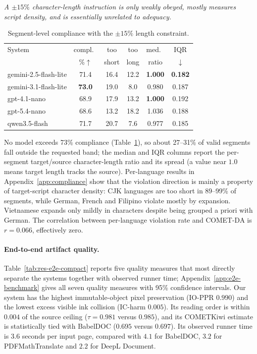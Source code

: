 \emph{A $\pm15\%$ character-length instruction is only weakly obeyed, mostly
measures script density, and is essentially unrelated to adequacy.}

\begin{table}[H]
    \centering
    \small
    \caption{Segment-level compliance with the $\pm15\%$ length constraint.}
    \label{tab:compliance-results}
    \setlength{\tabcolsep}{5pt}
    \begin{tabular}{@{}lccccc@{}}
        \toprule
        System & compl.\ & too & too & med.\ & IQR \\
               & \%$\uparrow$ & short & long & ratio & $\downarrow$ \\
        \midrule
        gemini-2.5-flash-lite & 71.4 & 16.4 & 12.2 & \textbf{1.000} & \textbf{0.182} \\
        gemini-3.1-flash-lite & \textbf{73.0} & 19.0 & 8.0 & 0.980 & 0.187 \\
        gpt-4.1-nano          & 68.9 & 17.9 & 13.2 & \textbf{1.000} & 0.192 \\
        gpt-5.4-nano          & 68.6 & 13.2 & 18.2 & 1.036 & 0.188 \\
        qwen3.5-flash         & 71.7 & 20.7 & 7.6 & 0.977 & 0.185 \\
        \bottomrule
    \end{tabular}
\end{table}

No model exceeds 73\% compliance (Table~\ref{tab:compliance-results}), so about
27--31\% of valid segments fall outside the requested band; the median and IQR
columns report the per-segment target/source character-length ratio and its
spread (a value near $1.0$ means target length tracks the source). Per-language results in Appendix~\ref{app:compliance}
show that the violation direction is mainly a property of target-script
character density: CJK languages are too short in 89--99\% of segments, while
German, French and Filipino violate mostly by expansion. Vietnamese expands only
mildly in characters despite being grouped a priori with German. The correlation
between per-language violation rate and COMET-DA is $r=0.066$, effectively zero.

\paragraph{End-to-end artifact quality.}
Table~\ref{tab:res-e2e-compact} reports five quality measures that most directly
separate the systems together with observed runner time;
Appendix~\ref{app:e2e-benchmark} gives all seven quality measures with 95\%
confidence intervals. Our system has the highest immutable-object
pixel preservation (IO-PPR $0.990$) and the lowest excess visible ink collision
(IC-harm $0.005$). Its reading order is within $0.004$ of the source ceiling
($\tau=0.981$ versus $0.985$), and its COMETKiwi estimate is statistically tied
with BabelDOC ($0.695$ versus $0.697$). Its observed runner time is $3.6$ seconds
per input page, compared with $4.1$ for BabelDOC, $3.2$ for PDFMathTranslate and
$2.2$ for DeepL Document.


